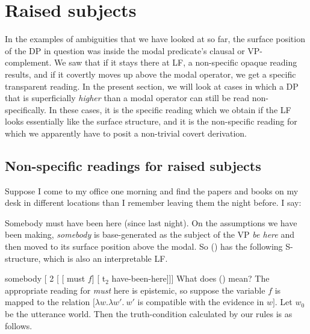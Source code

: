 \section{Raised subjects}
\label{sec:raised}

In the examples of ambiguities that we have looked at so far, the surface
position of the DP in question was inside the modal predicate's clausal or
VP-complement. We saw that if it stays there at LF, a non-specific opaque
reading results, and if it covertly moves up above the modal operator, we get a
specific transparent reading. In the present section, we will look at cases in
which a DP that is superficially \emph{higher} than a modal operator can still
be read non-specifically. In these cases, it is the specific reading which we
obtain if the LF looks essentially like the surface structure, and it is the
non-specific reading for which we apparently have to posit a non-trivial covert
derivation.

\subsection{Non-specific readings for raised subjects}

Suppose I come to my office one morning and find the papers and books on my desk
in different locations than I remember leaving them the night before. I say:

\ex \label{some} Somebody must have been here (since last night).\xe
%
On the assumptions we have been making, \emph{somebody} is base-generated as the
subject of the VP \emph{be here} and then moved to its surface position above
the modal. So (\lastx) has the following S-structure, which is also an
interpretable LF.

\ex \label{dere} somebody [ 2 [ [ must $f$] [ t$_2$ have-been-here]]] \xe
%
What does (\lastx) mean? The appropriate reading for \emph{must} here is
epistemic, so suppose the variable $f$ is mapped to the relation $\bigl[\lambda
w.\lambda w'.\ w'$ is compatible with the evidence in $w\bigr]$. Let $w_{0}$
be the utterance world. Then the truth-condition calculated by our rules is as
follows.

